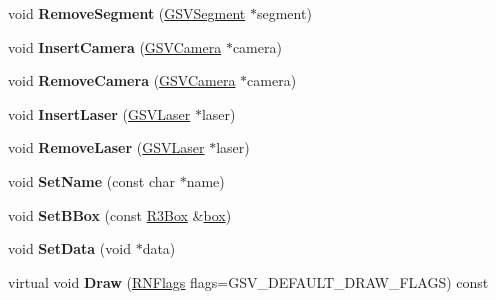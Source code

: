 \begin{DoxyCompactItemize}
\item 
void {\bfseries Remove\+Segment} (\hyperlink{class_g_s_v_segment}{G\+S\+V\+Segment} $\ast$segment)\hypertarget{class_g_s_v_run_a580a145cf854488d72e7732f2ab75472}{}\label{class_g_s_v_run_a580a145cf854488d72e7732f2ab75472}

\item 
void {\bfseries Insert\+Camera} (\hyperlink{class_g_s_v_camera}{G\+S\+V\+Camera} $\ast$camera)\hypertarget{class_g_s_v_run_a349c510adb9798062c2b9ef56d12af23}{}\label{class_g_s_v_run_a349c510adb9798062c2b9ef56d12af23}

\item 
void {\bfseries Remove\+Camera} (\hyperlink{class_g_s_v_camera}{G\+S\+V\+Camera} $\ast$camera)\hypertarget{class_g_s_v_run_a0ce0f3a21c92cf23e181e096e77b7292}{}\label{class_g_s_v_run_a0ce0f3a21c92cf23e181e096e77b7292}

\item 
void {\bfseries Insert\+Laser} (\hyperlink{class_g_s_v_laser}{G\+S\+V\+Laser} $\ast$laser)\hypertarget{class_g_s_v_run_adcdb06bb617bf9da799b54203a63deb4}{}\label{class_g_s_v_run_adcdb06bb617bf9da799b54203a63deb4}

\item 
void {\bfseries Remove\+Laser} (\hyperlink{class_g_s_v_laser}{G\+S\+V\+Laser} $\ast$laser)\hypertarget{class_g_s_v_run_ab6ae553fbf31948c2670b88f453740df}{}\label{class_g_s_v_run_ab6ae553fbf31948c2670b88f453740df}

\item 
void {\bfseries Set\+Name} (const char $\ast$name)\hypertarget{class_g_s_v_run_ab1e9ef3ec03f28d1c23ee4b695bbee06}{}\label{class_g_s_v_run_ab1e9ef3ec03f28d1c23ee4b695bbee06}

\item 
void {\bfseries Set\+B\+Box} (const \hyperlink{class_r3_box}{R3\+Box} \&\hyperlink{structbox}{box})\hypertarget{class_g_s_v_run_adee844bb0d3c17c47461f6bc6abb48e8}{}\label{class_g_s_v_run_adee844bb0d3c17c47461f6bc6abb48e8}

\item 
void {\bfseries Set\+Data} (void $\ast$data)\hypertarget{class_g_s_v_run_a71b0ed0107ed79c487ef96081d8d7359}{}\label{class_g_s_v_run_a71b0ed0107ed79c487ef96081d8d7359}

\item 
virtual void {\bfseries Draw} (\hyperlink{class_r_n_flags}{R\+N\+Flags} flags=G\+S\+V\+\_\+\+D\+E\+F\+A\+U\+L\+T\+\_\+\+D\+R\+A\+W\+\_\+\+F\+L\+A\+GS) const \hypertarget{class_g_s_v_run_a72b786cd0fa1a3dcf19c682016932f0a}{}\label{class_g_s_v_run_a72b786cd0fa1a3dcf19c682016932f0a}


\end{DoxyCompactItemize}
